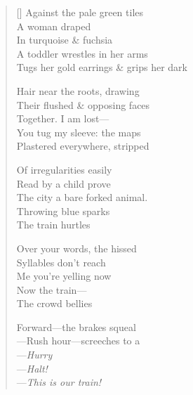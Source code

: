 \label{ch:leaning}
\settowidth{\versewidth}{Tugs her gold earrings \& grips her dark}
\begin{verse}[\versewidth]
Against the pale green tiles\\
A woman draped\\
In turquoise \& fuchsia\\
A toddler wrestles in her arms\\
Tugs her gold earrings \& grips her dark

Hair near the roots, drawing\\
Their flushed \& opposing faces\\
Together.     I am lost---\\
You tug my sleeve: the maps\\
Plastered everywhere, stripped

Of irregularities easily\\
Read by a child prove\\
The city a bare forked animal.\\
Throwing blue sparks\\
The train hurtles

Over your words, the hissed\\
Syllables don't reach\\
Me     you're yelling now\\
Now the train---\\
The crowd bellies

Forward---the brakes squeal\\
---Rush hour---screeches to a\\
---\textit{Hurry}\\
---\textit{Halt!}\\
---\textit{This is our train!}
\end{verse}
